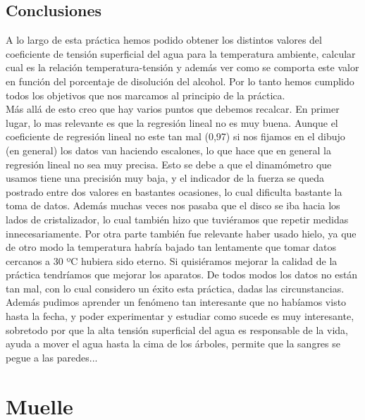 \documentclass[12pt,a4paper]{book}
\begin{document}
\section{Conclusiones}
A lo largo de esta práctica hemos podido obtener los distintos valores del coeficiente de tensión superficial del agua para la temperatura ambiente, calcular cual es la relación temperatura-tensión y además ver como se comporta este valor en función del porcentaje de disolución del alcohol. Por lo tanto hemos cumplido todos los objetivos que nos marcamos al principio de la práctica. \\

Más allá de esto creo que hay varios puntos que debemos recalcar. En primer lugar, lo mas relevante es que la regresión lineal no es muy buena. Aunque el coeficiente de regresión lineal no este tan mal (0,97) si nos fijamos en el dibujo (en general) los datos van haciendo escalones, lo que hace que en general la regresión lineal no sea muy precisa. Esto se debe a que el dinamómetro que usamos tiene una precisión muy baja, y el indicador de la fuerza se queda postrado entre dos valores en bastantes ocasiones, lo cual dificulta bastante la toma de datos. Además muchas veces nos pasaba que el disco se iba hacia los lados de cristalizador, lo cual también hizo que tuviéramos que repetir medidas innecesariamente. Por otra parte también fue relevante haber usado hielo, ya que de otro modo la  temperatura habría bajado tan lentamente que tomar datos cercanos a 30 ºC hubiera sido eterno. Si quisiéramos mejorar la calidad de la práctica tendríamos que mejorar los aparatos. De todos modos los datos no están tan mal, con lo cual considero un éxito esta práctica, dadas las circunstancias. \\

Además pudimos aprender un fenómeno tan interesante que no habíamos visto hasta la fecha, y poder experimentar y estudiar como sucede es muy interesante, sobretodo por que la alta tensión superficial del agua es responsable de la vida, ayuda a mover el agua hasta la cima de los árboles, permite que la sangres se pegue a las paredes... 




\chapter{Muelle}\label{Ch:muelle} \newpage
\end{document}
